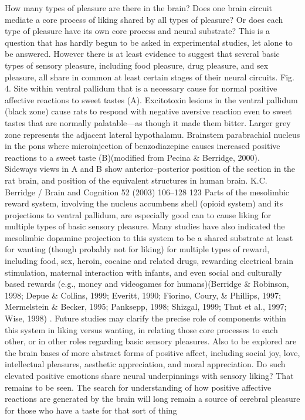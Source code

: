 \documentclass[conference]{IEEEtran}
\begin{document}
How many types of pleasure are there in the brain?
Does one brain circuit mediate a core process of
liking shared by all types of pleasure? Or does each
type of pleasure have its own core process and neural
substrate? This is a question that has hardly begun to
be asked in experimental studies, let alone to be answered. However there is at least evidence to suggest
that several basic types of sensory pleasure, including
food pleasure, drug pleasure, and sex pleasure, all
share in common at least certain stages of their neural
circuits.
Fig. 4. Site within ventral pallidum that is a necessary cause for normal positive affective reactions to sweet tastes (A). Excitotoxin lesions in the
ventral pallidum (black zone) cause rats to respond with negative aversive reaction even to sweet tastes that are normally palatable—as though it
made them bitter. Larger grey zone represents the adjacent lateral hypothalamu. Brainstem parabrachial nucleus in the
pons where microinjection of benzodiazepine causes increased positive reactions to a sweet taste (B)(modified from Pecina \& Berridge, 2000). ~
Sideways views in A and B show anterior–posterior position of the section in the rat brain, and position of the equivalent structures in human brain.
K.C. Berridge / Brain and Cognition 52 (2003) 106–128 123
Parts of the mesolimbic reward system, involving the
nucleus accumbens shell (opioid system) and its projections to ventral pallidum, are especially good can to cause liking for multiple types of basic
sensory pleasure. Many studies have also indicated the
mesolimbic dopamine projection to this system to be a
shared substrate at least for wanting (though probably
not for liking) for multiple types of reward, including
food, sex, heroin, cocaine and related drugs, rewarding
electrical brain stimulation, maternal interaction with
infants, and even social and culturally based rewards
(e.g., money and videogames for humans)(Berridge \& Robinson, 1998; Depue \& Collins, 1999; Everitt, 1990; Fiorino, Coury, \& Phillips, 1997; Mermelstein \& Becker, 1995; Panksepp, 1998; Shizgal, 1999; Thut et al., 1997; Wise, 1998)
. Future studies may clarify the precise role of components within this system in liking
versus wanting, in relating those core processes to
each other, or in other roles regarding basic sensory
pleasures.
Also to be explored are the brain bases of more abstract forms of positive affect, including social joy, love,
intellectual pleasures, aesthetic appreciation, and moral
appreciation. Do such elevated positive emotions share
neural underpinnings with sensory liking? That remains
to be seen. The search for understanding of how positive
affective reactions are generated by the brain will long
remain a source of cerebral pleasure for those who have
a taste for that sort of thing
\end{document}

